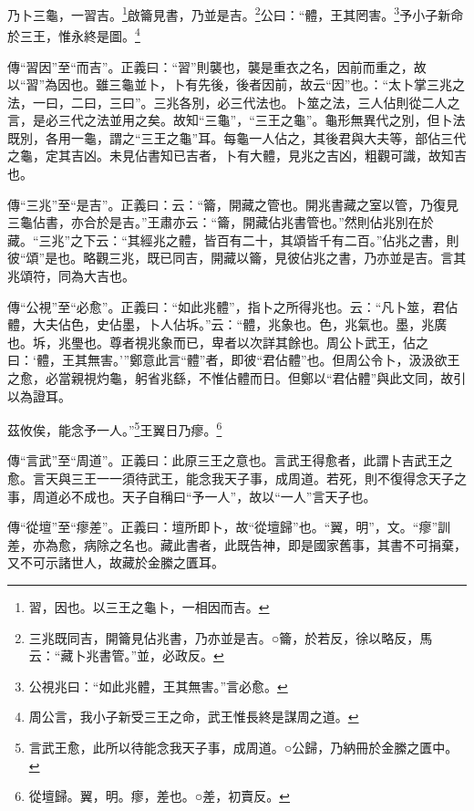 乃卜三龜，一習吉。\footnote{習，因也。以三王之龜卜，一相因而吉。}啟籥見書，乃並是吉。\footnote{三兆既同吉，開籥見佔兆書，乃亦並是吉。○籥，於若反，徐以略反，馬云：“藏卜兆書管。”並，必政反。}公曰：“體，王其罔害。\footnote{公視兆曰：“如此兆體，王其無害。”言必愈。}予小子新命於三王，惟永終是圖。\footnote{周公言，我小子新受三王之命，武王惟長終是謀周之道。}


{\noindent\zhuan{}\fzbyks 傳“習因”至“而吉”。正義曰：“習”則襲也，襲是重衣之名，因前而重之，故以“習”為因也。雖三龜並卜，卜有先後，後者因前，故云“因”也。：“太卜掌三兆之法，一曰，二曰，三曰”。三兆各別，必三代法也。卜筮之法，三人佔則從二人之言，是必三代之法並用之矣。故知“三龜”，“三王之龜”。龜形無異代之別，但卜法既別，各用一龜，謂之“三王之龜”耳。每龜一人佔之，其後君與大夫等，部佔三代之龜，定其吉凶。未見佔書知已吉者，卜有大體，見兆之吉凶，粗觀可識，故知吉也。 \par}

{\noindent\zhuan{}\fzbyks 傳“三兆”至“是吉”。正義曰：云：“籥，開藏之管也。開兆書藏之室以管，乃復見三龜佔書，亦合於是吉。”王肅亦云：“籥，開藏佔兆書管也。”然則佔兆別在於藏。“三兆”之下云：“其經兆之體，皆百有二十，其頌皆千有二百。”佔兆之書，則彼“頌”是也。略觀三兆，既已同吉，開藏以籥，見彼佔兆之書，乃亦並是吉。言其兆頌符，同為大吉也。 \par}

{\noindent\zhuan{}\fzbyks 傳“公視”至“必愈”。正義曰：“如此兆體”，指卜之所得兆也。云：“凡卜筮，君佔體，大夫佔色，史佔墨，卜人佔坼。”云：“體，兆象也。色，兆氣也。墨，兆廣也。坼，兆璺也。尊者視兆象而已，卑者以次詳其餘也。周公卜武王，佔之曰：‘體，王其無害。’”鄭意此言“體”者，即彼“君佔體”也。但周公令卜，汲汲欲王之愈，必當親視灼龜，躬省兆繇，不惟佔體而日。但鄭以“君佔體”與此文同，故引以為證耳。 \par}

茲攸俟，能念予一人。”\footnote{言武王愈，此所以待能念我天子事，成周道。○公歸，乃納冊於金縢之匱中。}王翼日乃瘳。\footnote{從壇歸。翼，明。瘳，差也。○差，初賣反。}

{\noindent\zhuan{}\fzbyks 傳“言武”至“周道”。正義曰：此原三王之意也。言武王得愈者，此謂卜吉武王之愈。言天與三王一一須待武王，能念我天子事，成周道。若死，則不復得念天子之事，周道必不成也。天子自稱曰“予一人”，故以“一人”言天子也。 \par}

{\noindent\zhuan{}\fzbyks 傳“從壇”至“瘳差”。正義曰：壇所即卜，故“從壇歸”也。“翼，明”，文。“瘳”訓差，亦為愈，病除之名也。藏此書者，此既告神，即是國家舊事，其書不可捐棄，又不可示諸世人，故藏於金縢之匱耳。 \par}

